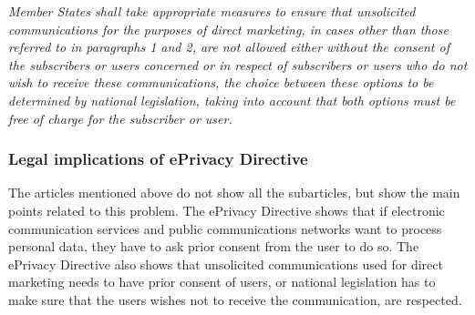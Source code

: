 \documentclass[11pt]{article}
\newcommand{\ePD}{ePrivacy Directive }
\begin{document}
\begin{itemize}
		\emph{Member States shall take appropriate measures to ensure that unsolicited communications for the purposes of direct marketing, in cases other than those referred to in paragraphs 1 and 2, are not allowed either without the consent of the subscribers or users concerned or in respect of subscribers or users who do not wish to receive these communications, the choice between these options to be determined by national legislation, taking into account that both options must be free of charge for the subscriber or user.}
\end{itemize}

\subsubsection{Legal implications of \ePD}

The articles mentioned above do not show all the subarticles, but show the main points related to this problem. The \ePD shows that if electronic communication services and public communications networks want to process personal data, they have to ask prior consent from the user to do so. The \ePD also shows that unsolicited communications used for direct marketing needs to have prior consent of users, or national legislation has to make sure that the users wishes not to receive the communication, are respected.
\end{document}
